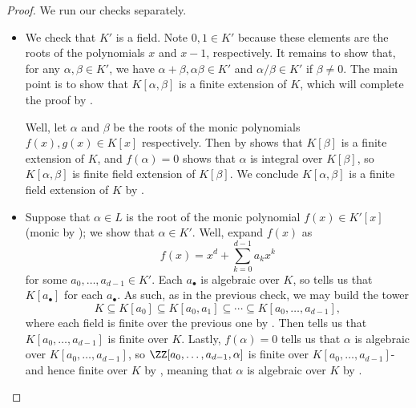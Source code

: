 \documentclass[../notes.tex]{subfiles}
\begin{document}
\begin{proof}
	We run our checks separately.
	\begin{itemize}
		\item We check that $K'$ is a field. Note $0,1\in K'$ because these elements are the roots of the polynomials $x$ and $x-1$, respectively. It remains to show that, for any $\alpha,\beta\in K'$, we have $\alpha+\beta,\alpha\beta\in K'$ and $\alpha/\beta\in K'$ if $\beta\ne0$. The main point is to show that $K[\alpha,\beta]$ is a finite extension of $K$, which will complete the proof by .
	
		Well, let $\alpha$ and $\beta$ be the roots of the monic polynomials $f(x),g(x)\in K[x]$ respectively. Then by  shows that $K[\beta]$ is a finite extension of $K$, and $f(\alpha)=0$ shows that $\alpha$ is integral over $K[\beta]$, so $K[\alpha,\beta]$ is finite field extension of $K[\beta]$. We conclude $K[\alpha,\beta]$ is a finite field extension of $K$ by .

		\item Suppose that $\alpha\in L$ is the root of the monic polynomial $f(x)\in K'[x]$ (monic by ); we show that $\alpha\in K'$. Well, expand $f(x)$ as
		\[f(x)=x^d+\sum_{k=0}^{d-1}a_kx^k\]
		for some $a_0,\ldots,a_{d-1}\in K'$. Each $a_\bullet$ is algebraic over $K$, so  tells us that $K[a_\bullet]$ for each $a_\bullet$. As such, as in the previous check, we may build the tower
		\[K\subseteq K[a_0]\subseteq K[a_0,a_1]\subseteq\cdots\subseteq K[a_0,\ldots,a_{d-1}],\]
		where each field is finite over the previous one by . Then  tells us that $K[a_0,\ldots,a_{d-1}]$ is finite over $K$. Lastly, $f(\alpha)=0$ tells us that $\alpha$ is algebraic over $K[a_0,\ldots,a_{d-1}]$, so $\ZZ[a_0,\ldots,a_{d-1},\alpha]$ is finite over $K[a_0,\ldots,a_{d-1}]$- and hence finite over $K$ by , meaning that $\alpha$ is algebraic over $K$ by .
		\qedhere
	\end{itemize}
\end{proof}
\end{document}
